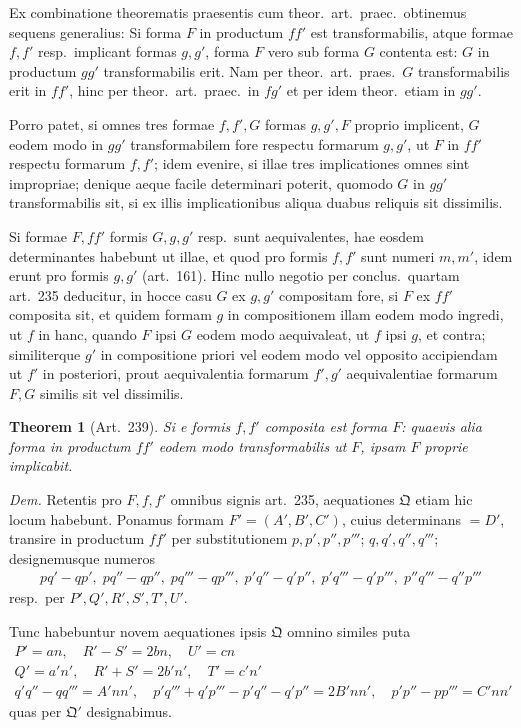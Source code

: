 \documentclass[12pt,a4paper]{article}
\theoremstyle{plain}
\newtheorem{theorem}{Theorem}[section]
\theoremstyle{definition}
\theoremstyle{remark}
\theoremstyle{problemstyle}
\begin{document}
Ex combinatione theorematis praesentis cum theor.\ art.\ praec.\ obtinemus sequens generalius: Si forma $F$ in productum $ff'$ est transformabilis, atque formae $f, f'$ resp.\ implicant formas $g, g'$, forma $F$ vero sub forma $G$ contenta est: $G$ in productum $gg'$ transformabilis erit. Nam per theor.\ art.\ praes.\ $G$ transformabilis erit in $ff'$, hinc per theor.\ art.\ praec.\ in $fg'$ et per idem theor.\ etiam in $gg'$.

Porro patet, si omnes tres formae $f, f', G$ formas $g, g', F$ proprio implicent, $G$ eodem modo in $gg'$ transformabilem fore respectu formarum $g, g'$, ut $F$ in $ff'$ respectu formarum $f, f'$; idem evenire, si illae tres implicationes omnes sint impropriae; denique aeque facile determinari poterit, quomodo $G$ in $gg'$ transformabilis sit, si ex illis implicationibus aliqua duabus reliquis sit dissimilis.

Si formae $F, ff'$ formis $G, g, g'$ resp.\ sunt aequivalentes, hae eosdem determinantes habebunt ut illae, et quod pro formis $f, f'$ sunt numeri $m, m'$, idem erunt pro formis $g, g'$ (art.\ 161). Hinc nullo negotio per conclus.\ quartam art.\ 235 deducitur, in hocce casu $G$ ex $g, g'$ compositam fore, si $F$ ex $ff'$ composita sit, et quidem formam $g$ in compositionem illam eodem modo ingredi, ut $f$ in hanc, quando $F$ ipsi $G$ eodem modo aequivaleat, ut $f$ ipsi $g$, et contra; similiterque $g'$ in compositione priori vel eodem modo vel opposito accipiendam ut $f'$ in posteriori, prout aequivalentia formarum $f', g'$ aequivalentiae formarum $F, G$ similis sit vel dissimilis.


\begin{theorem}[Art.\ 239]
Si e formis $f, f'$ composita est forma $F$: quaevis alia forma in productum $ff'$ eodem modo transformabilis ut $F$, ipsam $F$ proprie implicabit.
\end{theorem}

\emph{Dem.} Retentis pro $F, f, f'$ omnibus signis art.\ 235, aequationes $\mathfrak{Q}$ etiam hic locum habebunt. Ponamus formam $F' = (A', B', C')$, cuius determinans $= D'$, transire in productum $ff'$ per substitutionem $p, p', p'', p'''$; $q, q', q'', q'''$; designemusque numeros
\begin{gather*}
pq' - qp', \; pq'' - qp'', \; pq''' - qp''', \; p'q'' - q'p'', \; p'q''' - q'p''', \; p''q''' - q''p'''
\end{gather*}
resp.\ per $P', Q', R', S', T', U'$.

Tunc habebuntur novem aequationes ipsis $\mathfrak{Q}$ omnino similes puta
\begin{gather*}
P' = an, \quad R' - S' = 2bn, \quad U' = cn \\
Q' = a'n', \quad R' + S' = 2b'n', \quad T' = c'n' \\
q'q'' - qq''' = A'nn', \quad p'q''' + q'p''' - p'q'' - q'p'' = 2B'nn', \quad p'p'' - pp''' = C'nn'
\end{gather*}
quas per $\mathfrak{Q}'$ designabimus.
\end{document}
